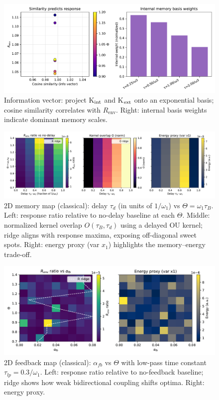 \documentclass[11pt,letterpaper]{article}
\begin{document}
\begin{figure}[t]
\centering
\includegraphics[width=0.9\linewidth]{figJ_info_vector.pdf}
\caption{Information vector: project K$_{\rm int}$ and K$_{\rm ext}$ onto an exponential basis; cosine similarity correlates with $R_{\mathrm{env}}$. Right: internal basis weights indicate dominant memory scales.}
\end{figure}

\begin{figure}[t]
\centering
\includegraphics[width=0.95\linewidth]{figK_memory_2d.pdf}
\caption{2D memory map (classical): delay $\tau_d$ (in units of $1/\omega_1$) vs $\Theta=\omega_1\tau_B$. Left: response ratio relative to no-delay baseline at each $\Theta$. Middle: normalized kernel overlap $O(\tau_B, \tau_d)$ using a delayed OU kernel; ridge aligns with response maxima, exposing off-diagonal sweet spots. Right: energy proxy (var $x_1$) highlights the memory--energy trade-off.}
\end{figure}

\begin{figure}[t]
\centering
\includegraphics[width=0.9\linewidth]{figL_feedback_2d.pdf}
\caption{2D feedback map (classical): $\alpha_{fb}$ vs $\Theta$ with low-pass time constant $\tau_{lp}=0.3/\omega_1$. Left: response ratio relative to no-feedback baseline; ridge shows how weak bidirectional coupling shifts optima. Right: energy proxy.}
\end{figure}
\end{document}

